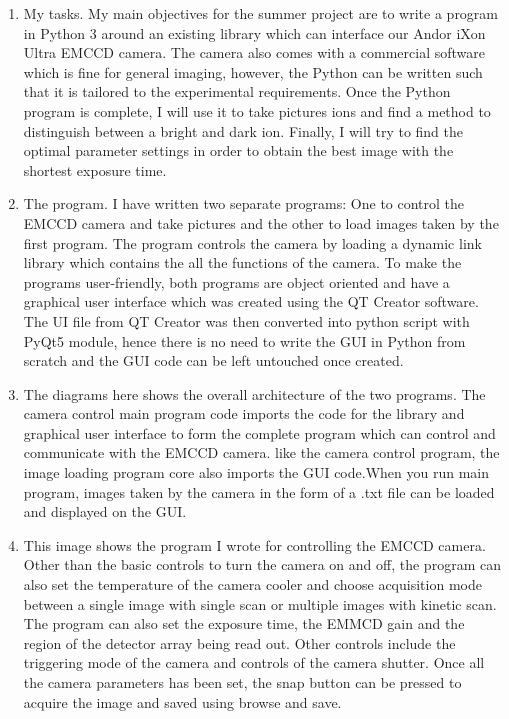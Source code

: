 \documentclass[12pt]{article}
\begin{document}
\begin{enumerate}
\item My tasks. My main objectives for the summer project are to write a program in Python 3 around an existing library which can interface our Andor iXon Ultra EMCCD camera. The camera also comes with a commercial software which is fine for general imaging, however, the Python can be written such that it is tailored to the experimental requirements. Once the Python program is complete, I will use it to take pictures ions and find a method to distinguish between a bright and dark ion. Finally, I will try to find the optimal parameter settings in order to obtain the best image with the shortest exposure time.

\item The program. I have written two separate programs: One to control the EMCCD camera and take pictures and the other to load images taken by the first program.  The program controls the camera by loading a dynamic link library which contains the all the functions of the camera. To make the programs user-friendly, both programs are object oriented and have a graphical user interface which was created using the QT Creator software. The UI file from QT Creator was then converted into python script with PyQt5 module, hence there is no need to write the GUI in Python from scratch and the GUI code can be left untouched once created.

\item The diagrams here shows the overall architecture of the two programs. The camera control main program code imports the code for the library and graphical user interface to form the complete program which can control and communicate with the EMCCD camera. like the camera control program, the image loading program core also imports the GUI code.When you run main program, images taken by the camera in the form of a .txt file can be loaded and displayed on the GUI.

\item This image shows the program I wrote for controlling the EMCCD camera. Other than the basic controls to turn the camera on and off, the program can also set the temperature of the camera cooler and choose acquisition mode between a single image with single scan or multiple images with kinetic scan. The program can also set the exposure time, the EMMCD gain and the region of the detector array being read out. Other controls include the triggering mode of the camera and controls of the camera shutter. Once all the camera parameters has been set, the snap button can be pressed to acquire the image and saved using browse and save.


\end{enumerate}
\end{document}
